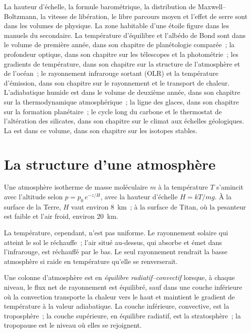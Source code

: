 \begin{recall}
La hauteur d'échelle, la formule barométrique, la distribution de
Maxwell--Boltzmann, la vitesse de libération, le libre parcours moyen et l'effet
de serre sont dans les volumes de physique. La zone habitable d'une étoile figure
dans les manuels du secondaire. La température d'équilibre et l'albédo de Bond sont
dans le volume de première année, dans son chapitre de planétologie comparée~; la
profondeur optique, dans son chapitre sur les télescopes et la photométrie~; les
gradients de température, dans son chapitre sur la structure de l'atmosphère et de
l'océan~; le rayonnement infrarouge sortant (OLR) et la température d'émission, dans
son chapitre sur le rayonnement et le transport de chaleur. L'adiabatique humide est
dans le volume de deuxième année, dans son chapitre sur la thermodynamique
atmosphérique~; la ligne des glaces, dans son chapitre sur la formation planétaire~; le
cycle long du carbone et le thermostat de l'altération des silicates, dans son chapitre
sur le climat aux échelles géologiques. La  est dans ce volume,
dans son chapitre sur les isotopes stables.
\end{recall}

\section{La structure d'une atmosphère}\label{sec:b3:planetary-atmospheres:structure}

Une atmosphère isotherme de masse moléculaire $m$ à la température $T$ s'amincit
avec l'altitude selon $p = p_0\,e^{-z/H}$, avec la hauteur d'échelle $H = kT/mg$.
À la surface de la Terre, $H$ vaut environ \qty{8}{km}~; à la surface de
Titan, où la pesanteur est faible et l'air froid, environ \qty{20}{km}.

La température, cependant, n'est pas uniforme. Le rayonnement solaire qui
atteint le sol le réchauffe~; l'air situé au-dessus, qui absorbe et émet
dans l'infrarouge, est réchauffé par le bas. Le seul rayonnement rendrait la
basse atmosphère si raide en température qu'elle se renverserait.

\begin{definition}\label{def:b3:planetary-atmospheres:rce}
Une colonne d'atmosphère est en \emph{équilibre
radiatif--convectif} lorsque, à chaque niveau, le flux net de rayonnement
est équilibré, sauf dans une couche inférieure où la convection transporte la
chaleur vers le haut et maintient le gradient de température à la valeur
adiabatique. La couche inférieure, convective, est la troposphère~; la couche
supérieure, en équilibre radiatif, est la stratosphère~; la tropopause est le
niveau où elles se rejoignent.
\end{definition}

